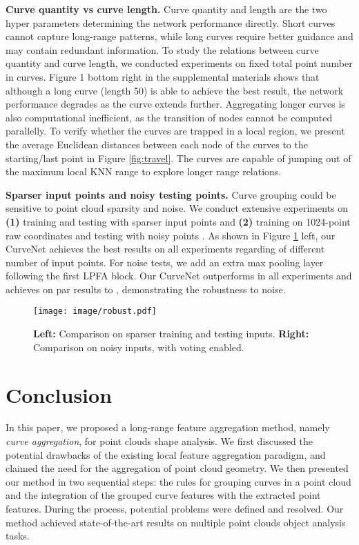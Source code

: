 \documentclass[10pt,twocolumn,letterpaper]{article}
\theoremstyle{definition}
\begin{document}
\noindent
\textbf{Curve quantity vs curve length.} Curve quantity  and length  are the two hyper parameters determining the network performance directly. Short curves cannot capture long-range patterns, while long curves require better guidance and may contain redundant information. To study the relations between curve quantity and curve length, we conducted experiments on fixed total point number in curves. Figure 1 bottom right in the supplemental materials shows that although a long curve (length 50) is able to achieve the best result, the network performance degrades as the curve extends further. Aggregating longer curves is also computational inefficient, as the transition of nodes cannot be computed parallelly. To verify whether the curves are trapped in a local region, we present the average Euclidean distances between each node of the curves to the starting/last point in Figure \ref{fig:travel}. The curves are capable of jumping out of the maximum local KNN range to explore longer range relations.

\noindent
\textbf{Sparser input points and noisy testing points.} Curve grouping could be sensitive to point cloud sparsity and noise. We conduct extensive experiments on \textbf{(1)} training and testing with sparser input points and \textbf{(2)} training on 1024-point raw coordinates and testing with noisy points \cite{yan2020pointasnl}. As shown in Figure \ref{fig:robust} left, our CurveNet achieves the best results on all experiments regarding of different number of input points. For noise tests, we add an extra max pooling layer following the first LPFA block. Our CurveNet outperforms \cite{shen2018mining, qi2017pointnet} in all experiments and achieves on par results to \cite{yan2020pointasnl}, demonstrating the robustness to noise.




\begin{figure}[t]
	\begin{center}
\texttt{[image: image/robust.pdf]}
	\end{center}
	\caption{\textbf{Left:} Comparison on sparser training and testing inputs. \textbf{Right:} Comparison on noisy inputs, with voting enabled.}
	\label{fig:robust}
\end{figure}


\section{Conclusion}
In this paper, we proposed a long-range feature aggregation method, namely \textit{curve aggregation}, for point clouds shape analysis. We first discussed the potential drawbacks of the existing local feature aggregation paradigm, and claimed the need for the aggregation of point cloud geometry. We then presented our method in two sequential steps: the rules for grouping curves in a point cloud and the integration of the grouped curve features with the extracted point features. During the process, potential problems were defined and resolved. Our method achieved state-of-the-art results on multiple point clouds object analysis tasks.

{\small


}
\end{document}
